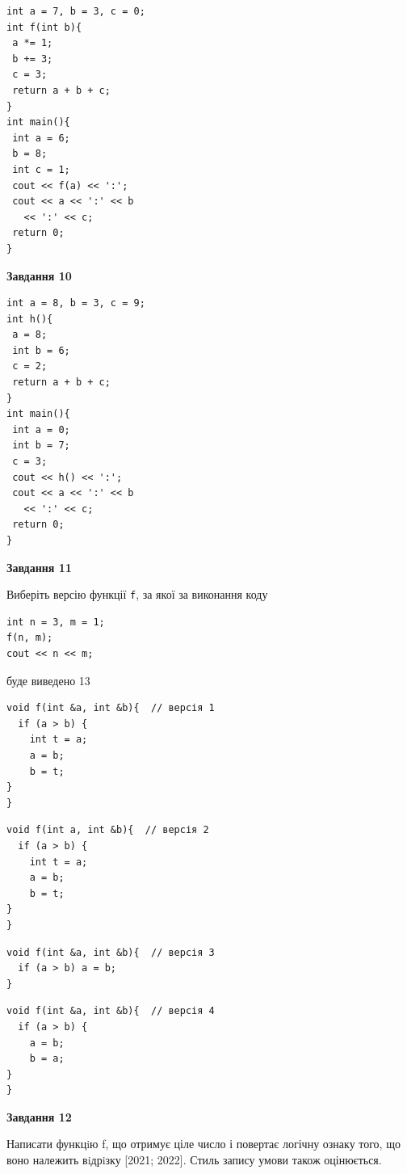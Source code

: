\documentclass[12pt, ukrainian]{article}
\def\code#1{\Verb!#1!}
\begin{document}
{\begin {large}
\begin{minipage}[t]{7.0cm}
\begin{verbatim}
int a = 7, b = 3, c = 0;
int f(int b){
 a *= 1;
 b += 3;
 c = 3;
 return a + b + c;
}
int main(){
 int a = 6;
 b = 8;
 int c = 1;
 cout << f(a) << ':';
 cout << a << ':' << b 
   << ':' << c;
 return 0;
}
\end{verbatim}



\begin{center}
\textbf{Завдання 10}
\end{center}
\vspace{-8mm}

\begin{verbatim}
int a = 8, b = 3, c = 9;
int h(){
 a = 8;
 int b = 6;
 c = 2;
 return a + b + c;
}
int main(){
 int a = 0;
 int b = 7;
 c = 3;
 cout << h() << ':';
 cout << a << ':' << b 
   << ':' << c;
 return 0;
}
\end{verbatim}

\end{minipage}
\vline \hspace{1mm}
\begin{minipage}[t]{11.0cm}

\begin{center}
\textbf{Завдання 11}
\end{center}
Виберіть версію функції \code{f}, за якої за виконання коду
\begin{verbatim}
int n = 3, m = 1;
f(n, m);
cout << n << m;
\end{verbatim}

буде виведено 13

\begin{verbatim}
void f(int &a, int &b){  // версія 1
  if (a > b) {
    int t = a;
    a = b;
    b = t;
}  
}
\end{verbatim}

\vspace{-8mm}\begin{verbatim}
void f(int a, int &b){  // версія 2
  if (a > b) {
    int t = a;
    a = b;
    b = t;
}  
}
\end{verbatim}

\vspace{-8mm}\begin{verbatim}
void f(int &a, int &b){  // версія 3
  if (a > b) a = b;
}
\end{verbatim}

\vspace{-8mm}\begin{verbatim}
void f(int &a, int &b){  // версія 4
  if (a > b) {
    a = b;
    b = a;
}  
}
\end{verbatim}



\begin{center}
\textbf{Завдання 12}
\end{center}

Написати функцiю f, що отримує ціле число і повертає логічну ознаку того, що воно належить вiдрiзку [2021; 2022]. Стиль запису умови також оцінюється.\par

\end{minipage}

\end {large}}
\end{document}
